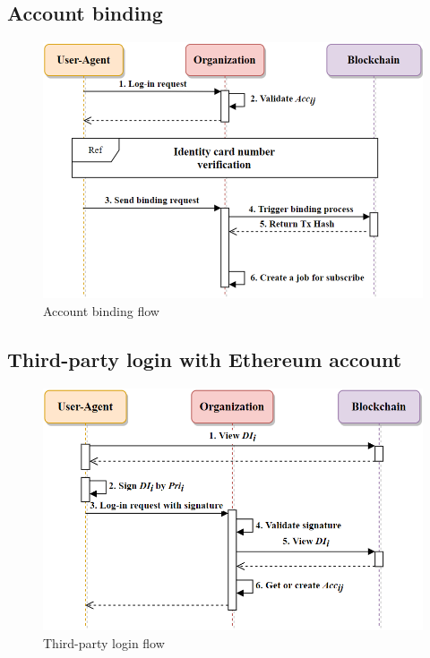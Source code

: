     \subsection{Account binding}
    \begin{figure}[htb]
        \centering
        \includegraphics[height=!,width=0.8\linewidth,keepaspectratio=true]{figures/account_binding.png}
        \caption{{\footnotesize Account binding flow}}
        \label{fig:accountBinding}
    \end{figure}

    \newpage
    \subsection{Third-party login with Ethereum account}
    \begin{figure}[htb]
        \centering
        \includegraphics[height=!,width=0.8\linewidth,keepaspectratio=true]{figures/Third_party_login.png}
        \caption{{\footnotesize Third-party login flow}}
        \label{fig:thirdPartyLogin}
    \end{figure}


    \newpage
